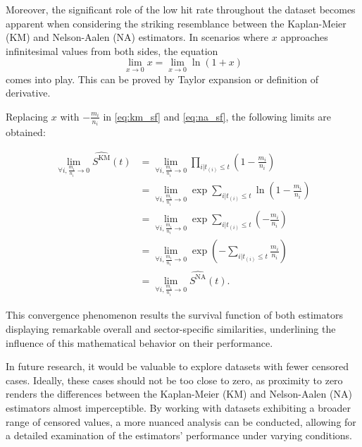 Moreover, the significant role of the low hit rate throughout the dataset becomes apparent when considering the striking resemblance between the Kaplan-Meier (KM) and Nelson-Aalen (NA) estimators. In scenarios where $x$ approaches infinitesimal values from both sides, the equation
\[
    \lim_{x \to 0} x = \lim_{x \to 0} \ln(1+x) 
\]
comes into play. This can be proved by Taylor expansion or definition of derivative.

Replacing $x$ with $-\frac{m_i}{n_i}$ in \ref{eq:km_sf} and \ref{eq:na_sf}, the following limits are obtained:

\begin{align*}
    \lim_{\forall i, \frac{m_i}{n_i} \to 0}\widehat {S^{\text{KM}}}(t) &= \lim_{\forall i, \frac{m_i}{n_i} \to 0} \prod_{i|t_{(i)} \leqslant t} \left(1 - \frac{m_i}{n_i}\right)\\
    &= \lim_{\forall i, \frac{m_i}{n_i} \to 0}\exp \sum_{i|t_{(i)} \leqslant t} \ln \left(1 - \frac{m_i}{n_i}\right)\\
    &= \lim_{\forall i, \frac{m_i}{n_i} \to 0}\exp \sum_{i|t_{(i)} \leqslant t} \left(- \frac{m_i}{n_i}\right)\\
    &= \lim_{\forall i, \frac{m_i}{n_i} \to 0}\exp {\left(-\sum_{i|t_{(i)} \leqslant t} \frac{m_i}{n_i}\right)}\\
    &= \lim_{\forall i, \frac{m_i}{n_i} \to 0}\widehat {S^{\text{NA}}}(t).
\end{align*}

This convergence phenomenon results the survival function of both estimators displaying remarkable overall and sector-specific similarities, underlining the influence of this mathematical behavior on their performance.

In future research, it would be valuable to explore datasets with fewer censored cases. Ideally, these cases should not be too close to zero, as proximity to zero renders the differences between the Kaplan-Meier (KM) and Nelson-Aalen (NA) estimators almost imperceptible. By working with datasets exhibiting a broader range of censored values, a more nuanced analysis can be conducted, allowing for a detailed examination of the estimators' performance under varying conditions.
